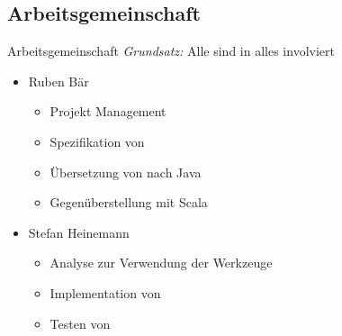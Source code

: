 \subsection{Arbeitsgemeinschaft}
\begin{frame}[t]{Arbeitsgemeinschaft}
	\emph{Grundsatz:} Alle sind in alles involviert
	\begin{itemize}[<+->]
		\item<1-> Ruben Bär
		\begin{itemize}
			\item<2-> Projekt Management
			\item<2-> Spezifikation von \ooplss
			\item<2-> Übersetzung von \ooplss nach Java
			\item<2-> Gegenüberstellung mit Scala
		\end{itemize}

		\item<1-> Stefan Heinemann
		\begin{itemize}
			\item<3-> Analyse zur Verwendung der Werkzeuge
			\item<3-> Implementation von \ooplss
			\item<3-> Testen von \ooplss
		\end{itemize}
	\end{itemize}
\end{frame}
